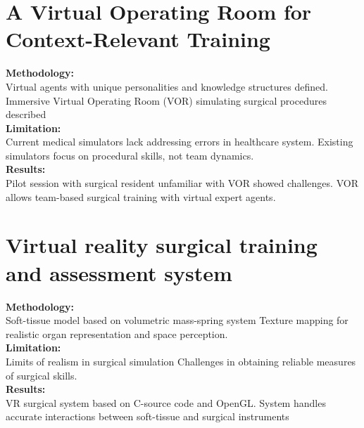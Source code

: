 \section{A Virtual Operating Room for Context-Relevant Training
	\cite{JournalArticle2}}
\textbf{Methodology:}\\
Virtual agents with unique personalities and knowledge structures defined. Immersive Virtual Operating Room (VOR) simulating surgical procedures described \\
\textbf{Limitation:}\\
Current medical simulators lack addressing errors in healthcare system. Existing simulators focus on procedural skills, not team dynamics.\\
\textbf{Results:}\\ Pilot session with surgical resident unfamiliar with VOR showed challenges. VOR allows team-based surgical training with virtual expert agents.

\section{Virtual reality surgical training and assessment system
	\cite{JournalArticle3}\cite{JournalArticle7}}
\textbf{Methodology:}\\ Soft-tissue model based on volumetric mass-spring system
Texture mapping for realistic organ representation and space perception.\\
\textbf{Limitation:}\\ Limits of realism in surgical simulation Challenges in obtaining reliable measures of surgical skills.\\
\textbf{Results:}\\ VR surgical system based on C-source code and OpenGL.
System handles accurate interactions between soft-tissue and surgical instruments